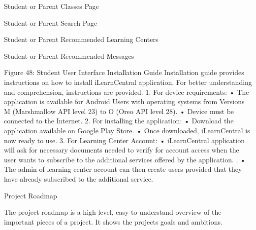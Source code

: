 Student or Parent Classes Page 









Student or Parent Search Page 









Student or Parent Recommended Learning Centers 









Student or Parent Recommended Messages









Figure 48: Student User Interface
Installation Guide
	Installation guide provides instructions on how to install iLearnCentral application. For better understanding and comprehension, instructions are provided. 
1.	For device requirements:
•	The application is available for Android Users with operating systems from Versions M (Marshmallow API level 23) to O (Oreo API level 28).
•	Device must be connected to the Internet.
2.	For installing the application:
•	Download the application available on Google Play Store.
•	Once downloaded, iLearnCentral is now ready to use.
3.	For Learning Center Account: 
•	iLearnCentral application will ask for necessary documents needed to verify for account access when the user wants to subscribe to the additional services offered by the application. .
•	The admin of learning center account can then create users provided that they have already subscribed to the additional service. 

























Project Roadmap

	The project roadmap is a high-level, easy-to-understand overview of the important pieces of a project. It shows the projects goals and ambitions.
 
